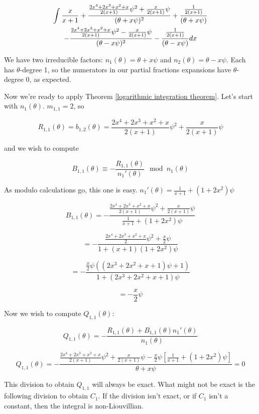 \begin{multline*}
\int {x\over{x+1}} + \frac{\frac{2x^4+2x^3+x^2+x}{2(x+1)}\psi^2 + \frac{x}{2(x+1)} \psi}{(\theta + x \psi)^2}
       + \frac{\frac{1}{2(x+1)}}{(\theta + x \psi)} \\
       - \frac{\frac{2x^4+2x^3+x^2+x}{2(x+1)}\psi^2 - \frac{x}{2(x+1)} \psi}{(\theta - x \psi)^2}
       - \frac{\frac{1}{2(x+1)}}{(\theta - x \psi)} dx
\end{multline*}


We have two irreducible factors: $n_1(\theta) = \theta + x \psi$ and
$n_2(\theta) = \theta - x \psi$.  Each has $\theta$-degree 1, so
the numerators in our partial fractions expansions have
$\theta$-degree 0, as expected.

Now we're ready to apply
Theorem \ref{logarithmic integration theorem}.  Let's start with
$n_1(\theta)$.  $m_{1,1}=2$, so

$$R_{1,1}(\theta) = b_{1,2}(\theta) = \frac{2x^4+2x^3+x^2+x}{2(x+1)}\psi^2 + \frac{x}{2(x+1)} \psi$$

and we wish to compute

$$ B_{1,1}(\theta) \equiv - \frac{R_{1,1}(\theta)}{n_1'(\theta) } \mod n_1(\theta)$$

As modulo calculations go, this one is easy. $n_1'(\theta) = \frac{1}{x+1} + (1 + 2 x^2) \psi$

$$ B_{1,1}(\theta) = - \frac{\frac{2x^4+2x^3+x^2+x}{2(x+1)}\psi^2 + \frac{x}{2(x+1)} \psi}{\frac{1}{x+1} + (1 + 2 x^2) \psi}$$

$$ = - \frac{\frac{2x^4+2x^3+x^2+x}{2}\psi^2 + \frac{x}{2} \psi}{1 + (x+1)(1 + 2 x^2) \psi}$$


$$ = - \frac{\frac{x}{2}\psi ( (2x^3+2x^2+x+1)\psi + 1)}{1 + (2 x^3 + 2 x^2 + x + 1) \psi}$$

$$ = - \frac{x}{2}\psi$$

Now we wish to compute $Q_{1,1}(\theta)$:

$$ Q_{1,1}(\theta) = - \frac{R_{1,1}(\theta) + B_{1,1}(\theta) n_1'(\theta)}{n_1(\theta)}$$

$$ Q_{1,1}(\theta) = - \frac{\frac{2x^4+2x^3+x^2+x}{2(x+1)}\psi^2 + \frac{x}{2(x+1)} \psi - \frac{x}{2}\psi \left[\frac{1}{x+1} + (1 + 2 x^2) \psi\right]}{\theta + x \psi} = 0$$

This division to obtain $Q_{1,1}$ will always be exact.  What might not be exact is the following division
to obtain $C_{1}$.  If the division isn't exact, or if $C_1$ isn't a constant, then the integral is non-Liouvillian.

